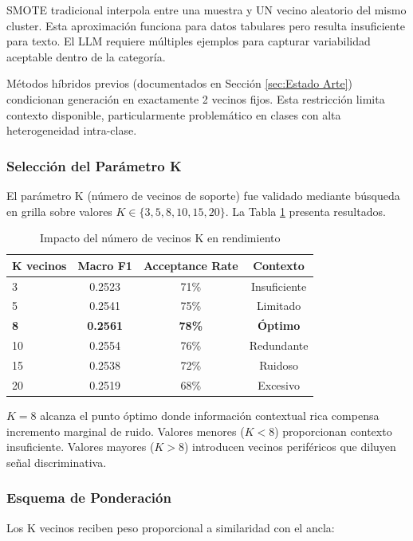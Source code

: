 SMOTE tradicional interpola entre una muestra y UN vecino aleatorio del mismo cluster. Esta aproximación funciona para datos tabulares pero resulta insuficiente para texto. El LLM requiere múltiples ejemplos para capturar variabilidad aceptable dentro de la categoría.

Métodos híbridos previos (documentados en Sección \ref{sec:Estado Arte}) condicionan generación en exactamente 2 vecinos fijos. Esta restricción limita contexto disponible, particularmente problemático en clases con alta heterogeneidad intra-clase.

\subsubsection*{Selección del Parámetro K}

El parámetro K (número de vecinos de soporte) fue validado mediante búsqueda en grilla sobre valores $K \in \{3, 5, 8, 10, 15, 20\}$. La Tabla \ref{tab:k_neighbors} presenta resultados.

\begin{table}[h]
\centering
\caption{Impacto del número de vecinos K en rendimiento}
\label{tab:k_neighbors}
\begin{tabular}{lccc}
\hline
K vecinos & Macro F1 & Acceptance Rate & Contexto \\
\hline
3 & 0.2523 & 71\% & Insuficiente \\
5 & 0.2541 & 75\% & Limitado \\
\textbf{8} & \textbf{0.2561} & \textbf{78\%} & \textbf{Óptimo} \\
10 & 0.2554 & 76\% & Redundante \\
15 & 0.2538 & 72\% & Ruidoso \\
20 & 0.2519 & 68\% & Excesivo \\
\hline
\end{tabular}
\end{table}

$K=8$ alcanza el punto óptimo donde información contextual rica compensa incremento marginal de ruido. Valores menores ($K<8$) proporcionan contexto insuficiente. Valores mayores ($K>8$) introducen vecinos periféricos que diluyen señal discriminativa.

\subsubsection*{Esquema de Ponderación}

Los K vecinos reciben peso proporcional a similaridad con el ancla:

